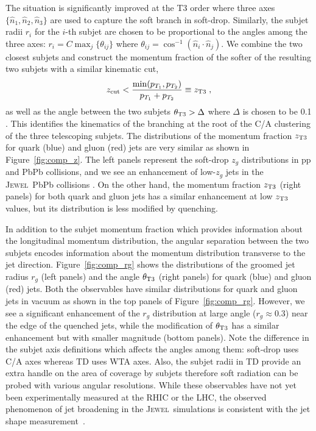 \documentclass[notoc,preprintnumbers]{JHEP3}
\newcommand{\jw}{\textsc{Jewel}~}
\begin{document}
The situation is significantly improved at the T3 order where three axes $\{\hat n_1,\hat n_2,\hat n_3\}$ are used to capture the soft branch in soft-drop. Similarly, the subjet radii $r_i$ for the $i$-th subjet are chosen to be proportional to the angles among the three axes: $r_i = C \max_{j} \{\theta_{ij}\}$ where $\theta_{ij}=\cos^{-1}(\hat n_i\cdot\hat n_j)$. We combine the two closest subjets and construct the momentum fraction of the softer of the resulting two subjets with a similar kinematic cut,
\begin{equation}
    z_{\rm cut} < \frac{\min(p_{T_1},p_{T_2})}{p_{T_1}+p_{T_2}} \equiv z_{\rm T3}\;,
\label{T3_z}
\end{equation}
as well as the angle between the two subjets $\theta_{\rm T3} > \Delta$ where $\Delta$ is chosen to be 0.1 \cite{Sirunyan:2017bsd}.
This identifies the kinematics of the branching at the root of the C/A clustering of the three telescoping subjets. The distributions of the momentum fraction $z_{\rm T3}$ for quark (blue) and gluon (red) jets are very similar as shown in Figure~\ref{fig:comp_z}.
The left panels represent the soft-drop $z_{g}$ distributions in pp and PbPb collisions, and we see an enhancement of low-$z_g$ jets in the \jw PbPb collisions \cite{KunnawalkamElayavalli:2017hxo,Milhano:2017nzm}. On the other hand, the momentum fraction $z_{\rm T3}$ (right panels) for both quark and gluon jets has a similar enhancement at low $z_{\rm T3}$ values, but its distribution is less modified by quenching.

In addition to the subjet momentum fraction which provides information about the longitudinal momentum distribution, the angular separation between the two subjets encodes information about the momentum distribution transverse to the jet direction. Figure~\ref{fig:comp_rg} shows the distributions of the groomed jet radius $r_g$ (left panels) and the angle $\theta_{\rm T3}$ (right panels) for quark (blue) and gluon (red) jets. %
Both the observables have similar distributions for quark and gluon jets in vacuum as shown in the top panels of Figure~\ref{fig:comp_rg}. However, we see a significant enhancement of the $r_g$ distribution at large angle ($r_g\approx0.3$) near the edge of the quenched jets, while the modification of $\theta_{\rm T3}$ has a similar enhancement but with smaller magnitude (bottom panels). Note the difference in the subjet axis definitions which affects the angles among them: soft-drop uses C/A axes whereas TD uses WTA axes. Also, the subjet radii in TD provide an extra handle on the area of coverage by subjets therefore soft radiation can be probed with various angular resolutions. While these observables have not yet been experimentally measured at the RHIC or the LHC, the observed phenomenon of jet broadening in the \jw simulations is consistent with the jet shape measurement~\cite{Chatrchyan:2013kwa}.
\end{document}
